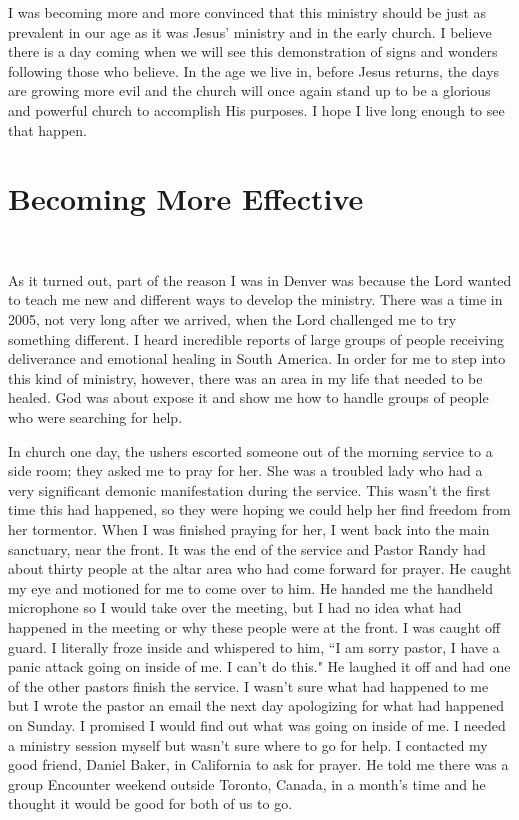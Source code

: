 \documentclass[oneside,12pt]{book}
\begin{document}
I was becoming more and more convinced that this ministry should be just as prevalent in our age as it was Jesus' ministry and in the early church. I believe there is a day coming when we will see this demonstration of signs and wonders following those who believe. In the age we live in, before Jesus returns, the days are growing more evil and the church will once again stand up to be a glorious and powerful church to accomplish His purposes. I hope I live long enough to see that happen. 


\chapter{Becoming More Effective}
\

As it turned out, part of the reason I was in Denver was because the Lord wanted to teach me new and different ways to develop the ministry. There was a time in 2005, not very long after we arrived, when the Lord challenged me to try something different. I heard incredible reports of large groups of people receiving deliverance and emotional healing in South America. In order for me to step into this kind of ministry, however, there was an area in my life that needed to be healed. God was about expose it and show me how to handle groups of people who were searching for help.

In church one day, the ushers escorted someone out of the morning service to a side room; they asked me to pray for her. She was a troubled lady who had a very significant demonic manifestation during the service. This wasn't the first time this had happened, so they were hoping we could help her find freedom from her tormentor. When I was finished praying for her, I went back into the main sanctuary, near the front. It was the end of the service and Pastor Randy had about thirty people at the altar area who had come forward for prayer. He caught my eye and motioned for me to come over to him. He handed me the handheld microphone so I would take over the meeting, but I had no idea what had happened in the meeting or why these people were at the front. I was caught off guard. I literally froze inside and whispered to him, ``I am sorry pastor, I have a panic attack going on inside of me. I can't do this." He laughed it off and had one of the other pastors finish the service. I wasn't sure what had happened to me but I wrote the pastor an email the next day apologizing for what had happened on Sunday. I promised I would find out what was going on inside of me. I needed a ministry session myself but wasn't sure where to go for help. I contacted my good friend, Daniel Baker, in California to ask for prayer. He told me there was a group Encounter weekend outside Toronto, Canada, in a month's time and he thought it would be good for both of us to go. 
\end{document}

